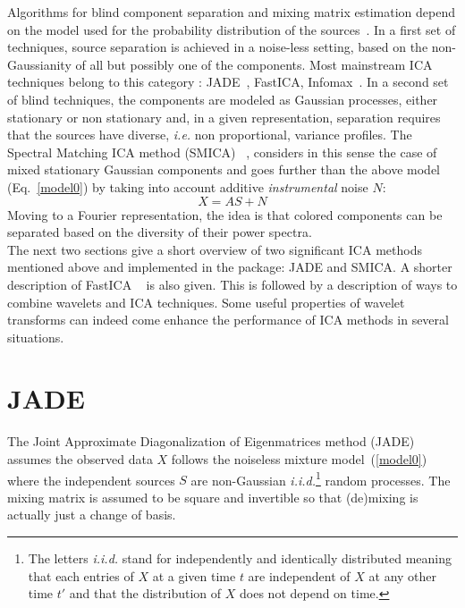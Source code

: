 Algorithms for blind component separation and mixing matrix estimation depend on the model used for the probability distribution 
of the sources~\cite{ica:3easy}. In a first set of techniques, source separation is achieved in a noise-less setting, based on the 
non-Gaussianity of all but possibly one of the components. Most mainstream ICA techniques belong to this category : JADE~\cite{ica:jade}, 
FastICA, Infomax~\cite{ica:icabook}. In a second set of blind techniques, the components are modeled as Gaussian processes, either 
stationary or non stationary and, in a given representation, separation requires that the sources have diverse, \emph{i.e.} non 
proportional, variance profiles. The Spectral Matching ICA method (SMICA) ~\cite{ica:Del2003}, considers in this sense the case of 
mixed stationary Gaussian components and goes further than the above model (Eq.~\ref{model0}) by taking into account additive 
\emph{instrumental } noise $N$:
\begin{equation}\label{model1}
X = A S + N
\end{equation}
Moving to a Fourier representation, the idea is that colored components can be separated based on the diversity of their power spectra.\\ 
 
The next two sections give a short overview of two significant ICA methods mentioned above and implemented in the \mrs package: 
JADE and SMICA. A shorter description of FastICA ~\cite{ica:icabook} is also given. This is followed by a description of ways to 
combine wavelets and ICA techniques. Some useful properties of wavelet transforms can indeed come enhance the performance of ICA 
methods in several situations. 

    
\section{JADE}

The Joint Approximate Diagonalization of Eigenmatrices method (JADE) assumes the observed data $X$ follows the noiseless mixture 
model~(\ref{model0}) where the independent sources $S$ are non-Gaussian \emph{i.i.d.}\footnote{The letters \emph{i.i.d.} stand for 
independently and identically distributed meaning that each entries of $X$ at a given time $t$ are independent of $X$ at any other 
time $t'$ and that the distribution of $X$ does not depend on time. } random processes. The mixing matrix is assumed to be square 
and invertible so that (de)mixing is actually just a change of basis.

